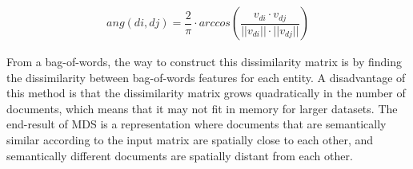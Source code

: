 \begin{align}
ang(di, dj) = \dfrac{2}{\pi} \cdot \textit{arccos}(\dfrac{v_{di} \cdot v_{dj}}{|| v_{di} || \cdot || v_{dj} ||})
\end{align}

From a bag-of-words, the way to construct this dissimilarity matrix is by finding the dissimilarity between bag-of-words features for each entity. A disadvantage of this method is that the dissimilarity matrix grows quadratically in the number of documents, which means that it may not fit in memory for larger datasets. The end-result of MDS is a representation where documents that are semantically similar according to the input matrix are spatially close to each other, and semantically different documents are spatially distant from each other.











